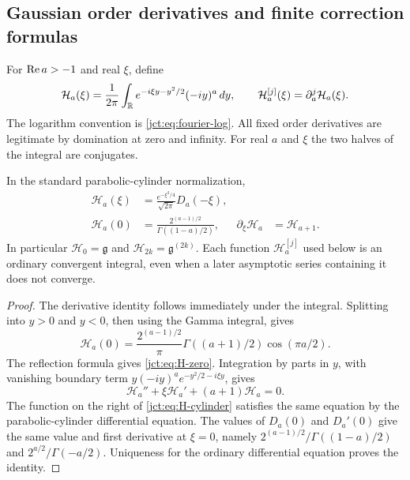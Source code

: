 \subsection{Gaussian order derivatives and finite correction formulas}
\label{jct:sec:kernels}

For $\operatorname{Re} a>-1$ and real $\xi$, define
\begin{equation}\label{jct:eq:H-definition}
 \mathcal{H}_a(\xi)=\frac1{2\pi}\int_{\mathbb R}
     e^{-i\xi y-y^2/2}(-iy)^a\,dy,
 \qquad \mathcal{H}_a^{[j]}(\xi)=\partial_a^j\mathcal{H}_a(\xi).
\end{equation}
The logarithm convention is \eqref{jct:eq:fourier-log}. All fixed order
derivatives are legitimate by domination at zero and infinity. For
real $a$ and $\xi$ the two halves of the integral are conjugates.

\begin{proposition}
\label{jct:prop:H}
In the standard parabolic-cylinder normalization,
\begin{align}
 \mathcal{H}_a(\xi)&=\frac{e^{-\xi^2/4}}{\sqrt{2\pi}}D_a(-\xi),
       \label{jct:eq:H-cylinder}\\
 \mathcal{H}_a(0)&=\frac{2^{(a-1)/2}}{\Gamma((1-a)/2)},
 &\partial_\xi\mathcal{H}_a&=\mathcal{H}_{a+1}.
       \label{jct:eq:H-zero}
\end{align}
In particular $\mathcal{H}_0=\mathfrak{g}$ and
$\mathcal{H}_{2k}=\mathfrak{g}^{(2k)}$. Each function
$\mathcal{H}_a^{[j]}$ used below is an ordinary convergent integral, even
when a later asymptotic series containing it does not converge.
\end{proposition}

\begin{proof}
The derivative identity follows immediately under the integral.
Splitting into $y>0$ and $y<0$, then using the Gamma integral,
gives
\[
 \mathcal{H}_a(0)=\frac{2^{(a-1)/2}}{\pi}
       \Gamma((a+1)/2)\cos(\pi a/2).
\]
The reflection formula gives \eqref{jct:eq:H-zero}. Integration by
parts in $y$, with vanishing boundary term
$y(-iy)^ae^{-y^2/2-i\xi y}$, gives
\[
 \mathcal{H}_a''+\xi\mathcal{H}_a'+(a+1)\mathcal{H}_a=0.
\]
The function on the right of \eqref{jct:eq:H-cylinder} satisfies the same
equation by the parabolic-cylinder differential equation.
The values of $D_a(0)$ and $D_a'(0)$
\cite[12.2.4--12.2.7]{jct:cylinder} give the same value and first
derivative at $\xi=0$, namely
$2^{(a-1)/2}/\Gamma((1-a)/2)$ and
$2^{a/2}/\Gamma(-a/2)$. Uniqueness for the ordinary differential
equation proves the identity.
\end{proof}

